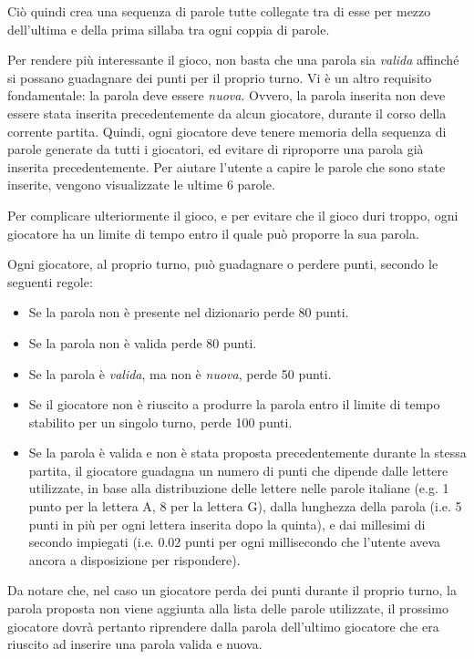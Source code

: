 \documentclass[10.5pt]{article}
\begin{document}
Ciò quindi crea una sequenza di parole tutte collegate tra di esse per mezzo dell'ultima e della prima sillaba tra ogni coppia di parole. 

Per rendere più interessante il gioco, non basta che una parola sia \emph{valida} affinché si possano guadagnare dei punti per il proprio turno. Vi è un altro requisito fondamentale: la parola deve essere \emph{nuova}. Ovvero, la parola inserita non deve essere stata inserita precedentemente da alcun giocatore, durante il corso della corrente partita. Quindi, ogni giocatore deve tenere memoria della sequenza di parole generate da tutti i giocatori, ed evitare di riproporre una parola già inserita precedentemente. Per aiutare l'utente a capire le parole che sono state inserite, vengono visualizzate le ultime 6 parole.

Per complicare ulteriormente il gioco, e per evitare che il gioco duri troppo, ogni giocatore ha un limite di tempo entro il quale può proporre la sua parola.

Ogni giocatore, al proprio turno, può guadagnare o perdere punti, secondo le seguenti regole:
\begin{itemize}
\item Se la parola non è presente nel dizionario perde 80 punti.
\item Se la parola non è valida perde 80 punti.
\item Se la parola è \emph{valida}, ma non è \emph{nuova}, perde 50 punti.
\item Se il giocatore non è riuscito a produrre la parola entro il limite di tempo stabilito per un singolo turno, perde 100 punti.
\item Se la parola è valida e non è stata proposta precedentemente durante la stessa partita, il giocatore guadagna un numero di punti che dipende dalle lettere utilizzate, in base alla distribuzione delle lettere nelle parole italiane (e.g. 1 punto per la lettera A, 8 per la lettera G), dalla lunghezza della parola (i.e. 5 punti in più per ogni lettera inserita dopo la quinta), e dai millesimi di secondo impiegati (i.e. 0.02 punti per ogni millisecondo che l'utente aveva ancora a disposizione per rispondere).
\end{itemize}

Da notare che, nel caso un giocatore perda dei punti durante il proprio turno, la parola proposta non viene aggiunta alla lista delle parole utilizzate, il prossimo giocatore dovrà pertanto riprendere dalla parola dell'ultimo giocatore che era riuscito ad inserire una parola valida e nuova.
\end{document}

